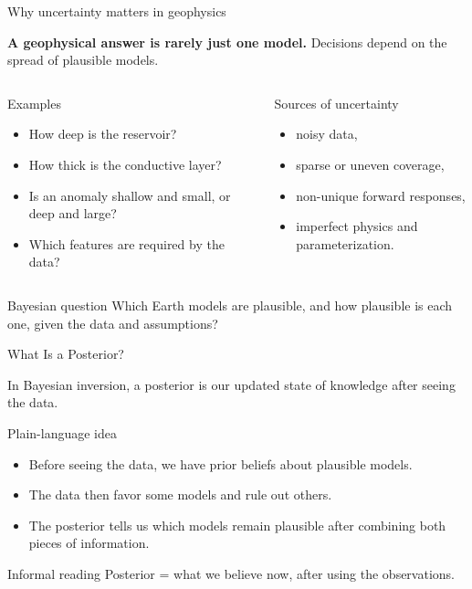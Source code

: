 \documentclass[aspectratio=169]{beamer}
\begin{document}
\begin{frame}{Why uncertainty matters in geophysics}
\small

\textbf{A geophysical answer is rarely just one model.} Decisions depend on the spread of plausible models.

\begin{columns}[T]
\begin{block}{Examples}
\begin{itemize}
    \item[--] How deep is the reservoir?
    \item[--] How thick is the conductive layer?
    \item[--] Is an anomaly shallow and small, or deep and large?
    \item[--] Which features are required by the data?
\end{itemize}
\end{block}

\begin{block}{Sources of uncertainty}
\begin{itemize}
    \item[--] noisy data,
    \item[--] sparse or uneven coverage,
    \item[--] non-unique forward responses,
    \item[--] imperfect physics and parameterization.
\end{itemize}
\end{block}
\end{columns}

\begin{alertblock}{Bayesian question}
Which Earth models are plausible, and how plausible is each one, given the data and assumptions?
\end{alertblock}
\end{frame}

\begin{frame}{What Is a Posterior?}
\small

In Bayesian inversion, a \alert{posterior} is our updated state of knowledge \alert{after seeing the data}.

\begin{block}{Plain-language idea}
\begin{itemize}
    \item[--] Before seeing the data, we have prior beliefs about plausible models.
    \item[--] The data then favor some models and rule out others.
    \item[--] The posterior tells us which models remain plausible after combining both pieces of information.
\end{itemize}
\end{block}

\begin{alertblock}{Informal reading}
Posterior = \alert{what we believe now}, after using the observations.
\end{alertblock}
\end{frame}
\end{document}
